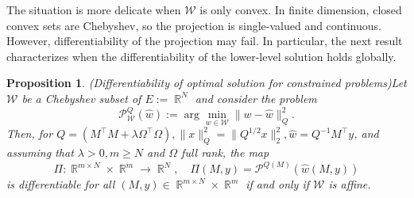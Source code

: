 \documentclass{article}
\DeclareMathOperator{\R}{\mathbb{R}}
\newtheorem{Proposition}[Th]{Proposition}
\begin{document}
The situation is more delicate when $\mathscr W$ is only convex. In finite dimension, closed convex sets are Chebyshev, so the projection is single-valued and continuous. However, differentiability of the projection may fail. In particular, the next result characterizes when the differentiability of the lower-level solution holds globally.
\begin{Proposition}(Differentiability of optimal solution for constrained problems)\label{prop:differentiability_optimalconstrained} 
Let $\mathscr W$ be a Chebyshev subset of $E:=\R^N$ and consider the problem
    \[
    \mathcal P_{\mathscr W}^{Q}(\widehat w):= \arg\min_{w \in \mathscr W} \|w-\widehat w \|_{Q}^2.
    \]
Then, for $Q = (M^\top M + \lambda \Omega^\top  \Omega), \| x\|_Q^2 = \|Q^{1/2}x \|_2^2, \widehat w = Q^{-1} M^\top y$, and assuming that $\lambda > 0, m \geq N$ and $\Omega$ full rank, the map 
\[
\Pi : \R^{m \times N} \times \R^{m} \to \R^{N},\quad  \Pi(M,y) = \mathcal P^{Q(M)}(\widehat w(M,y))
\]
is differentiable for all $(M,y) \in \R^{m \times N} \times \R^{m}$ if and only if $\mathscr W$ is affine.
\end{Proposition}
\end{document}
